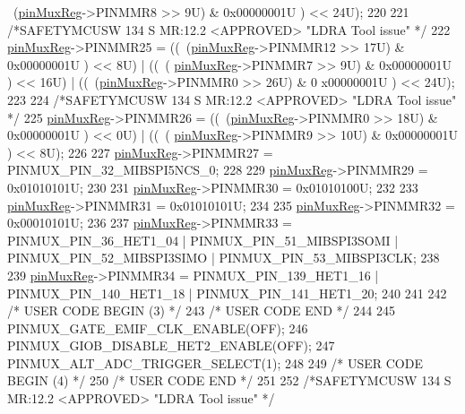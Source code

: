 \begin{DoxyCode}
      ~(\mbox{\hyperlink{reg__pinmux_8h_a489be2306394971fc7586946f88d6380}{pinMuxReg}}->PINMMR8 >> 9U) & 0x00000001U ) << 24U);
220     
221     \textcolor{comment}{/*SAFETYMCUSW 134 S MR:12.2 <APPROVED> "LDRA Tool issue" */}
222     \mbox{\hyperlink{reg__pinmux_8h_a489be2306394971fc7586946f88d6380}{pinMuxReg}}->PINMMR25 =   ((~(\mbox{\hyperlink{reg__pinmux_8h_a489be2306394971fc7586946f88d6380}{pinMuxReg}}->PINMMR12 >> 17U) & 0x00000001U ) << 8U) | ((~(
      \mbox{\hyperlink{reg__pinmux_8h_a489be2306394971fc7586946f88d6380}{pinMuxReg}}->PINMMR7 >> 9U) & 0x00000001U ) << 16U) | ((~(\mbox{\hyperlink{reg__pinmux_8h_a489be2306394971fc7586946f88d6380}{pinMuxReg}}->PINMMR0 >> 26U) & 0
      x00000001U ) << 24U);
223     
224     \textcolor{comment}{/*SAFETYMCUSW 134 S MR:12.2 <APPROVED> "LDRA Tool issue" */}
225     \mbox{\hyperlink{reg__pinmux_8h_a489be2306394971fc7586946f88d6380}{pinMuxReg}}->PINMMR26 =   ((~(\mbox{\hyperlink{reg__pinmux_8h_a489be2306394971fc7586946f88d6380}{pinMuxReg}}->PINMMR0 >> 18U) & 0x00000001U ) << 0U) | ((~(
      \mbox{\hyperlink{reg__pinmux_8h_a489be2306394971fc7586946f88d6380}{pinMuxReg}}->PINMMR9 >> 10U) & 0x00000001U ) << 8U);
226     
227     \mbox{\hyperlink{reg__pinmux_8h_a489be2306394971fc7586946f88d6380}{pinMuxReg}}->PINMMR27 =   PINMUX\_PIN\_32\_MIBSPI5NCS\_0;
228         
229     \mbox{\hyperlink{reg__pinmux_8h_a489be2306394971fc7586946f88d6380}{pinMuxReg}}->PINMMR29 =   0x01010101U;
230 
231     \mbox{\hyperlink{reg__pinmux_8h_a489be2306394971fc7586946f88d6380}{pinMuxReg}}->PINMMR30 = 0x01010100U;
232 
233     \mbox{\hyperlink{reg__pinmux_8h_a489be2306394971fc7586946f88d6380}{pinMuxReg}}->PINMMR31 = 0x01010101U;
234 
235     \mbox{\hyperlink{reg__pinmux_8h_a489be2306394971fc7586946f88d6380}{pinMuxReg}}->PINMMR32 = 0x00010101U;    
236 
237     \mbox{\hyperlink{reg__pinmux_8h_a489be2306394971fc7586946f88d6380}{pinMuxReg}}->PINMMR33 =   PINMUX\_PIN\_36\_HET1\_04 | PINMUX\_PIN\_51\_MIBSPI3SOMI | 
      PINMUX\_PIN\_52\_MIBSPI3SIMO | PINMUX\_PIN\_53\_MIBSPI3CLK;
238 
239     \mbox{\hyperlink{reg__pinmux_8h_a489be2306394971fc7586946f88d6380}{pinMuxReg}}->PINMMR34 =   PINMUX\_PIN\_139\_HET1\_16 | PINMUX\_PIN\_140\_HET1\_18 | 
      PINMUX\_PIN\_141\_HET1\_20;
240 
241     
242 \textcolor{comment}{/* USER CODE BEGIN (3) */}
243 \textcolor{comment}{/* USER CODE END */}
244 
245     PINMUX\_GATE\_EMIF\_CLK\_ENABLE(OFF);
246     PINMUX\_GIOB\_DISABLE\_HET2\_ENABLE(OFF);
247     PINMUX\_ALT\_ADC\_TRIGGER\_SELECT(1);
248     
249 \textcolor{comment}{/* USER CODE BEGIN (4) */}
250 \textcolor{comment}{/* USER CODE END */}
251 
252     \textcolor{comment}{/*SAFETYMCUSW 134 S MR:12.2 <APPROVED> "LDRA Tool issue" */}

\end{DoxyCode}
